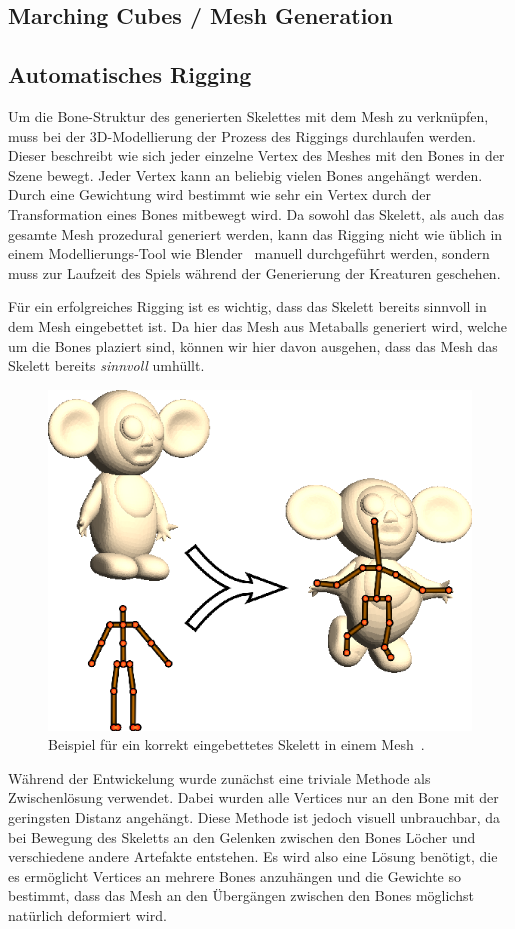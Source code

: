 \subsection{Marching Cubes / Mesh Generation}


\subsection{Automatisches Rigging}
Um die Bone-Struktur des generierten Skelettes mit dem Mesh zu verknüpfen, muss bei der 3D-Modellierung der Prozess des Riggings durchlaufen werden. Dieser beschreibt wie sich jeder einzelne Vertex des Meshes mit den Bones in der Szene bewegt. Jeder Vertex kann an beliebig vielen Bones angehängt werden. Durch eine Gewichtung wird bestimmt wie sehr ein Vertex durch der Transformation eines Bones mitbewegt wird.
Da sowohl das Skelett, als auch das gesamte Mesh prozedural generiert werden, kann das Rigging nicht wie üblich in einem Modellierungs-Tool wie Blender~\cite{blender} manuell durchgeführt werden, sondern muss zur Laufzeit des Spiels während der Generierung der Kreaturen geschehen.

Für ein erfolgreiches Rigging ist es wichtig, dass das Skelett bereits sinnvoll in dem Mesh eingebettet ist. Da hier das Mesh aus Metaballs generiert wird, welche um die Bones plaziert sind, können wir hier davon ausgehen, dass das Mesh das Skelett bereits \emph{sinnvoll} umhüllt.

\begin{figure}[h!]
	\centering
	\includegraphics[width=0.6\linewidth]{resources/img/skeleton_embedding.png}
	\caption{Beispiel für ein korrekt eingebettetes Skelett in einem Mesh~\cite{bone_heat_paper}.}
	\label{fig:skeleton_embedding}
\end{figure}

Während der Entwickelung wurde zunächst eine triviale Methode als Zwischenlösung verwendet. Dabei wurden alle Vertices nur an den Bone mit der geringsten Distanz angehängt. Diese Methode ist jedoch visuell unbrauchbar, da bei Bewegung des Skeletts an den Gelenken zwischen den Bones Löcher und verschiedene andere Artefakte entstehen. Es wird also eine Lösung benötigt, die es ermöglicht Vertices an mehrere Bones anzuhängen und die Gewichte so bestimmt, dass das Mesh an den Übergängen zwischen den Bones möglichst natürlich deformiert wird.

